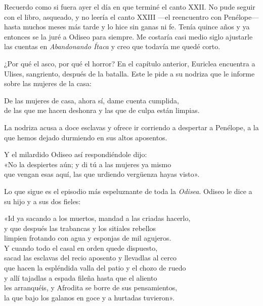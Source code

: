 \label{cap:ninas}

Recuerdo como si fuera ayer el día en que terminé el canto XXII. No pude seguir con el libro, asqueado, y no leería el canto XXIII ---el reencuentro con Penélope--- hasta muchos meses más tarde y lo hice sin ganas ni fe. Tenía quince años y ya entonces se la juré a Odiseo para siempre. Me costaría casi medio siglo ajustarle las cuentas en \emph{Abandonando Ítaca} y creo que todavía me quedé corto.

¿Por qué el asco, por qué el horror? En el capítulo anterior, Euriclea encuentra a Ulises, sangriento, después de la batalla. Este le pide a su nodriza que le informe sobre las mujeres de la casa:

\begin{versocita}
De las mujeres de casa, ahora sí, dame cuenta cumplida,\\
de las que me hacen deshonra y las que de culpa están limpias.
\end{versocita}

La nodriza acusa a doce esclavas y ofrece ir corriendo a despertar a Penélope, a la que hemos dejado durmiendo en sus altos aposentos.

\begin{versocita}
Y el milardido Odiseo así respondiéndole dijo:\\
«No la despiertes aún; y di tú a las mujeres ya mismo\\
que vengan esas aquí, las que urdiendo vergüenza hayas visto».
\end{versocita}

Lo que sigue es el episodio más espeluznante de toda la \emph{Odisea}. Odiseo le dice a su hijo y a sus dos fieles:

\begin{versocita}
«Id ya sacando a los muertos, mandad a las criadas hacerlo,\\
y que después las trabancas y los sitiales rebellos\\
limpien frotando con agua y esponjas de mil agujeros.\\
Y cuando todo el casal en orden quede dispuesto,\\
sacad las esclavas del recio aposento y llevadlas al cerco\\
que hacen la espléndida valla del patio y el chozo de ruedo\\
y allí tajadlas a espada fileña hasta que el aliento\\
les arranquéis, y Afrodita se borre de sus pensamientos,\\
la que bajo los galanos en goce y a hurtadas tuvieron».
\end{versocita}

